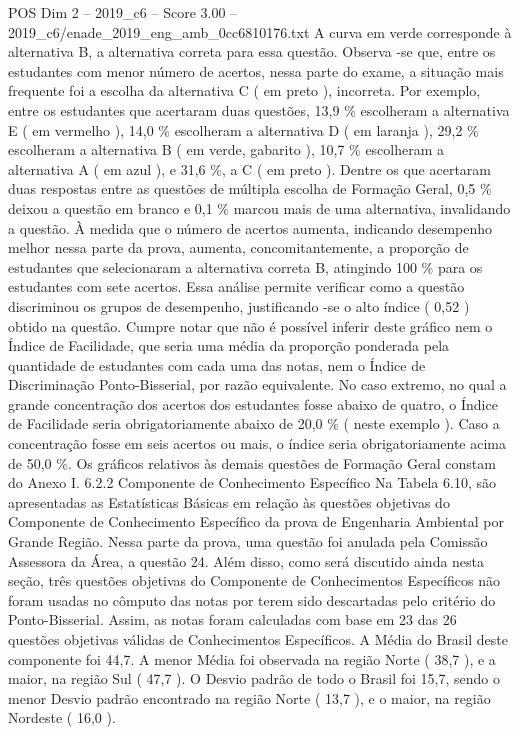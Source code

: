\begin{textsample}{POS Dim 2 – 2019\_c6 – Score 3.00 – 2019\_c6/enade\_2019\_eng\_amb\_0cc6810176.txt}
A curva em verde corresponde à alternativa B, a alternativa correta para essa questão.
Observa -se que, entre os estudantes com menor número de acertos, nessa parte do exame, a situação mais frequente foi a escolha da alternativa C ( em preto ), incorreta.
Por exemplo, entre os estudantes que acertaram duas questões, 13,9 \% escolheram a alternativa E ( em vermelho ), 14,0 \% escolheram a alternativa D ( em laranja ), 29,2 \% escolheram a alternativa B ( em verde, gabarito ), 10,7 \% escolheram a alternativa A ( em azul ), e 31,6 \%, a C ( em preto ).
Dentre os que acertaram duas respostas entre as questões de múltipla escolha de Formação Geral, 0,5 \% deixou a questão em branco e 0,1 \% marcou mais de uma alternativa, invalidando a questão.
À medida que o número de acertos aumenta, indicando desempenho melhor nessa parte da prova, aumenta, concomitantemente, a proporção de estudantes que selecionaram a alternativa correta B, atingindo 100 \% para os estudantes com sete acertos.
Essa análise permite verificar como a questão discriminou os grupos de desempenho, justificando -se o alto índice ( 0,52 ) obtido na questão.
Cumpre notar que não é possível inferir deste gráfico nem o Índice de Facilidade, que seria uma média da proporção ponderada pela quantidade de estudantes com cada uma das notas, nem o Índice de Discriminação Ponto-Bisserial, por razão equivalente.
No caso extremo, no qual a grande concentração dos acertos dos estudantes fosse abaixo de quatro, o Índice de Facilidade seria obrigatoriamente abaixo de 20,0 \% ( neste exemplo ).
Caso a concentração fosse em seis acertos ou mais, o índice seria obrigatoriamente acima de 50,0 \%.
Os gráficos relativos às demais questões de Formação Geral constam do Anexo I. 6.2.2 Componente de Conhecimento Específico Na Tabela 6.10, são apresentadas as Estatísticas Básicas em relação às questões objetivas do Componente de Conhecimento Específico da prova de Engenharia Ambiental por Grande Região.
Nessa parte da prova, uma questão foi anulada pela Comissão Assessora da Área, a questão 24.
Além disso, como será discutido ainda nesta seção, três questões objetivas do Componente de Conhecimentos Específicos não foram usadas no cômputo das notas por terem sido descartadas pelo critério do Ponto-Bisserial.
Assim, as notas foram calculadas com base em 23 das 26 questões objetivas válidas de Conhecimentos Específicos.
A Média do Brasil deste componente foi 44,7.
A menor Média foi observada na região Norte ( 38,7 ), e a maior, na região Sul ( 47,7 ).
O Desvio padrão de todo o Brasil foi 15,7, sendo o menor Desvio padrão encontrado na região Norte ( 13,7 ), e o maior, na região Nordeste ( 16,0 ).

\end{textsample}
